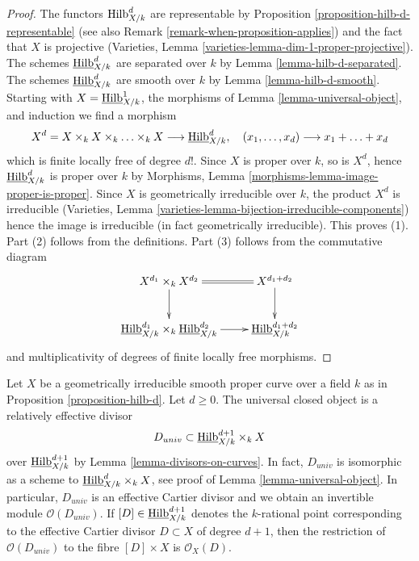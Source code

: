 \begin{proof}
The functors $\mathrm{Hilb}^d_{X/k}$ are representable by
Proposition \ref{proposition-hilb-d-representable}
(see also Remark \ref{remark-when-proposition-applies})
and the fact that $X$ is projective
(Varieties, Lemma \ref{varieties-lemma-dim-1-proper-projective}).
The schemes $\underline{\mathrm{Hilb}}^d_{X/k}$ are separated
over $k$ by Lemma \ref{lemma-hilb-d-separated}.
The schemes $\underline{\mathrm{Hilb}}^d_{X/k}$ are smooth
over $k$ by Lemma \ref{lemma-hilb-d-smooth}.
Starting with $X = \underline{\mathrm{Hilb}}^1_{X/k}$,
the morphisms of Lemma \ref{lemma-universal-object},
and induction we find a morphism
$$
X^d = X \times_k X \times_k \ldots \times_k X \longrightarrow
\underline{\mathrm{Hilb}}^d_{X/k},\quad
(x_1, \ldots, x_d) \longrightarrow x_1 + \ldots + x_d
$$
which is finite locally free of degree $d!$. Since $X$ is
proper over $k$, so is $X^d$, hence
$\underline{\mathrm{Hilb}}^d_{X/k}$ is proper over $k$ by
Morphisms, Lemma \ref{morphisms-lemma-image-proper-is-proper}.
Since $X$ is geometrically irreducible over $k$, the product
$X^d$ is irreducible
(Varieties, Lemma \ref{varieties-lemma-bijection-irreducible-components})
hence the image is irreducible (in fact geometrically irreducible).
This proves (1). Part (2) follows from the definitions. Part (3) follows
from the commutative diagram
$$
\xymatrix{
X^{d_1} \times_k X^{d_2} \ar[d] \ar@{=}[r] & X^{d_1 + d_2} \ar[d] \\
\underline{\Hilbfunctor}^{d_1}_{X/k}
\times_k
\underline{\Hilbfunctor}^{d_2}_{X/k}
\ar[r] &
\underline{\Hilbfunctor}^{d_1 + d_2}_{X/k}
}
$$
and multiplicativity of degrees of finite locally free morphisms.
\end{proof}

\begin{remark}
\label{remark-universal-object-hilb-d}
Let $X$ be a geometrically irreducible smooth proper curve over a field $k$
as in Proposition \ref{proposition-hilb-d}. Let $d \geq 0$. The universal
closed object is a relatively effective divisor
$$
D_{univ} \subset \underline{\mathrm{Hilb}}^{d + 1}_{X/k} \times_k X
$$
over $\underline{\mathrm{Hilb}}^{d + 1}_{X/k}$ by
Lemma \ref{lemma-divisors-on-curves}.
In fact, $D_{univ}$ is isomorphic as a scheme to
$\underline{\mathrm{Hilb}}^d_{X/k} \times_k X$, see proof of
Lemma \ref{lemma-universal-object}.
In particular, $D_{univ}$ is an effective Cartier divisor and
we obtain an invertible module
$\mathcal{O}(D_{univ})$. If $[D] \in \underline{\mathrm{Hilb}}^{d + 1}_{X/k}$
denotes the $k$-rational point corresponding to the effective
Cartier divisor $D \subset X$ of degree $d + 1$, then the restriction
of $\mathcal{O}(D_{univ})$ to the fibre $[D] \times X$ is
$\mathcal{O}_X(D)$.
\end{remark}


